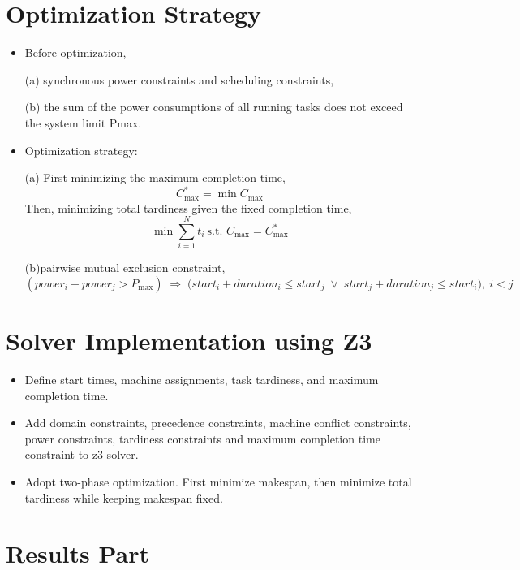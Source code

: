 \documentclass{article}
\begin{document}
\section{Optimization Strategy}
\begin{itemize}
  \item Before optimization,

  
(a) synchronous power constraints and scheduling constraints,


(b) the sum of the power consumptions of all running tasks does not exceed the system limit Pmax.

\item Optimization strategy:


(a) First minimizing the maximum completion time,
\[
C_{\max}^* = \min C_{\max}
\]
Then, minimizing total tardiness given the fixed completion time,
\[
\min \sum_{i=1}^{N} t_i  \ \text{s.t. } C_{\max} = C_{\max}^*
\]


(b)pairwise mutual exclusion constraint,
\[
(power_i + power_j > P_{\max})
\;\Rightarrow\;
\big( start_i + duration_i \le start_j \;\lor\;
start_j + duration_j \le start_i \big),
\ i < j
\]
\end{itemize}

\section{Solver Implementation using Z3}

\begin{itemize}
  \item Define start times, machine assignments, task tardiness, and maximum completion time.
  \item Add domain constraints, precedence constraints, machine conflict constraints, power constraints, tardiness constraints and maximum completion time constraint to z3 solver.
  \item Adopt two-phase optimization. First minimize makespan, then minimize total tardiness while keeping makespan fixed.

\end{itemize}

\section{Results Part}
\end{document}
